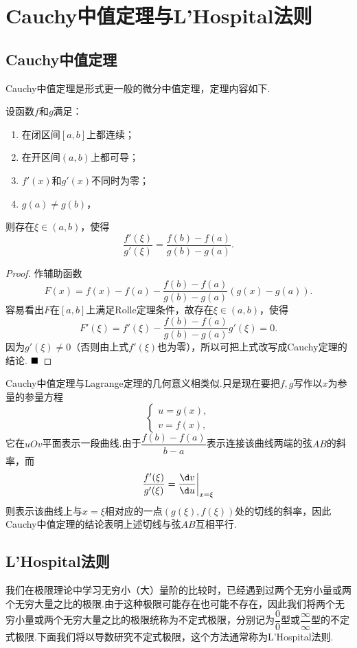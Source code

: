 \section{Cauchy中值定理与L'Hospital法则}
\subsection{Cauchy中值定理}
Cauchy中值定理是形式更一般的微分中值定理，定理内容如下.
\begin{theorem}[Cauchy中值定理]
	设函数$f$和$g$满足：
	\begin{enumerate}
		\item 在闭区间$\left[a,b\right]$上都连续；
		\item 在开区间$(a,b)$上都可导；
		\item $f'(x)$和$g'(x)$不同时为零；
		\item $g(a)\neq g(b)$，
	\end{enumerate}
	则存在$\xi\in(a,b)$，使得
	$$\frac{f'(\xi)}{g'(\xi)}=\frac{f(b)-f(a)}{g(b)-g(a)}.$$
\end{theorem}
\begin{proof}
	作辅助函数
	$$F(x)=f(x)-f(a)-\frac{f(b)-f(a)}{g(b)-g(a)}(g(x)-g(a)).$$
	容易看出$F$在$\left[a,b\right]$上满足Rolle定理条件，故存在$\xi\in(a,b)$，使得
	$$F'(\xi)=f'(\xi)-\frac{f(b)-f(a)}{g(b)-g(a)}g'(\xi)=0.$$
	因为$g'(\xi)\neq 0$（否则由上式$f'(\xi)$也为零），所以可把上式改写成Cauchy定理的结论.
	$\hfill\blacksquare$
\end{proof}
\hspace*{\fill}

Cauchy中值定理与Lagrange定理的几何意义相类似.只是现在要把$f,g$写作以$x$为参量的参量方程
\begin{equation*}
	\left\{
	\begin{aligned}
		u=g(x),\\
		v=f(x),
	\end{aligned}
	\right.
\end{equation*}
它在$uOv$平面表示一段曲线.由于$\dfrac{f(b)-f(a)}{b-a}$表示连接该曲线两端的弦$AB$的斜率，而$$\frac{f'(\xi)}{g'(\xi)}=\frac{\d v}{\d u}\bigg|_{x=\xi}$$则表示该曲线上与$x=\xi$相对应的一点$(g(\xi),f(\xi))$处的切线的斜率，因此Cauchy中值定理的结论表明上述切线与弦$AB$互相平行.
\subsection{L'Hospital法则}
我们在极限理论中学习无穷小（大）量阶的比较时，已经遇到过两个无穷小量或两个无穷大量之比的极限.由于这种极限可能存在也可能不存在，因此我们将两个无穷小量或两个无穷大量之比的极限统称为{\heiti 不定式极限}，分别记为$\dfrac{0}{0}$型或$\dfrac{\infty}{\infty}$型的不定式极限.下面我们将以导数研究不定式极限，这个方法通常称为{\heiti L'Hospital法则}.

